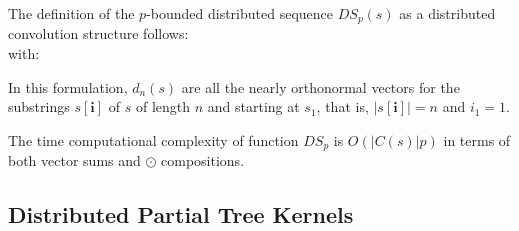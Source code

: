 \documentclass[twoside,11pt]{article}
\def\vec#1{\mathbf{#1}}
\def\mychar#1{C(#1)}
\def\nchar#1{|\mychar{#1}|}
\def\mo{\odot}
\def\comment#1#2{}
\def\finalcomment#1#2{}
\def\myinsert#1{#1}
\begin{document}


%
%
%
%
%
%

\finalcomment{The notation at the bottom of page 18 needs to be defined.}{R1.10}
The definition of the $p$-bounded distributed sequence $DS_p(s)$ as a distributed convolution structure follows:
\begin{displaymath}

\end{displaymath}
with:
\begin{displaymath}

\end{displaymath}


\finalcomment{The end of Section 5.4: This is confusing and needs to be re-worked.}{R1.11}
In this formulation, $d_n(s)$ are all \myinsert{the nearly orthonormal vectors for} the substrings $s[\vec{i}]$ of $s$ of length $n$ and starting at $s_1$, that is, $|s[\vec{i}]| = n$ and $i_1=1$. 

The \myinsert{time} computational complexity of function $DS_p$ is $O(\nchar{s}p)$ in terms of both vector sums and $\mo$ compositions. 


\subsection{Distributed Partial Tree Kernels\comment{NEW}{}}
\end{document}
